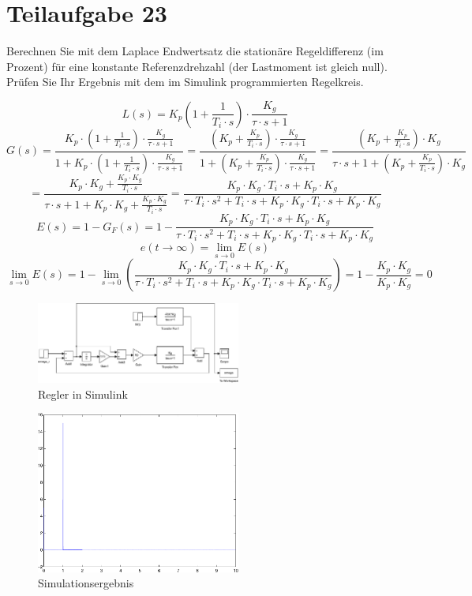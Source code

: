 \section{Teilaufgabe 23}
\begin{aufgabe}
    Berechnen Sie mit dem Laplace Endwertsatz die stationäre Regeldifferenz 
    (im Prozent) für eine konstante Referenzdrehzahl (der Lastmoment ist 
    gleich null).  Prüfen Sie Ihr Ergebnis mit dem im Simulink programmierten 
    Regelkreis.
\end{aufgabe}
\[ L(s) = K_p \left(1 + \frac{1}{T_i \cdot s}\right) 
    \cdot \frac{K_g}{\tau \cdot s + 1} \]
\[ G(s) = \frac{K_p \cdot \left(1 + \frac{1}{T_i \cdot s}\right) 
        \cdot \frac{K_g}{\tau \cdot s + 1}}
        {1 + K_p \cdot \left(1 + \frac{1}{T_i \cdot s}\right) 
        \cdot \frac{K_g} {\tau \cdot s + 1}}
    = \frac{\left(K_p + \frac{K_p}{T_i \cdot s}\right) 
        \cdot \frac{K_g}{\tau \cdot s + 1}}
        {1 + \left(K_p + \frac{K_p}{T_i \cdot s}\right) 
        \cdot \frac{K_g} {\tau \cdot s + 1}}
    = \frac{\left(K_p + \frac{K_p}{T_i \cdot s}\right) 
        \cdot K_g}
        {\tau \cdot s + 1 + \left(K_p + \frac{K_p}{T_i \cdot s}\right) 
        \cdot K_g}
\]
\[  = \frac{K_p \cdot K_g + \frac{K_p \cdot K_g}{T_i \cdot s}}
        {\tau \cdot s + 1 + K_p \cdot K_g + \frac{K_p \cdot K_g}{T_i \cdot s}}
    = \frac{K_p \cdot K_g \cdot T_i \cdot s + K_p \cdot K_g}
        {\tau \cdot T_i \cdot s^2 + T_i \cdot s 
        + K_p \cdot K_g \cdot T_i \cdot s + K_p \cdot K_g}
\]
\[ E(s) = 1 - G_F(s) = 1 - \frac{K_p \cdot K_g \cdot T_i \cdot s + K_p \cdot K_g}
        {\tau \cdot T_i \cdot s^2 + T_i \cdot s
        + K_p \cdot K_g \cdot T_i \cdot s + K_p \cdot K_g}
\]
\[ e(t \to \infty) = \lim\limits_{s \to 0} E(s) \]
\[ \lim\limits_{s \to 0} E(s) = 1 - \lim\limits_{s \to 0} 
        \left(\frac{K_p \cdot K_g \cdot T_i \cdot s + K_p \cdot K_g}
        {\tau \cdot T_i \cdot s^2 + T_i \cdot s 
        + K_p \cdot K_g \cdot T_i \cdot s + K_p \cdot K_g}\right)
    = 1 - \frac{K_p \cdot K_g}{K_p \cdot K_g}
    = 0
\]
\begin{figure}[h!]
    \centering
    \includegraphics[width=0.6\textwidth]{23/regler_pi_diff.pdf}
    \caption{Regler in Simulink}
    \label{fig:23}
\end{figure}
\begin{figure}[h!]
    \centering
    \includegraphics[width=0.6\textwidth]{23/regler_pi_diff_plot.pdf}
    \caption{Simulationsergebnis}
    \label{fig:23plot}
\end{figure}
